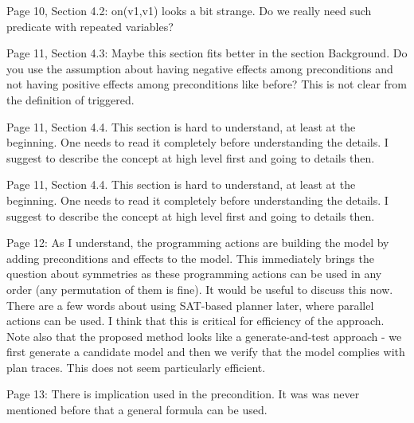 \documentclass{article}
\begin{document}
\begin{mdframed}[hidealllines=true,backgroundcolor=gray!20]
  Page 10, Section 4.2: on(v1,v1) looks a bit strange. Do we really need such predicate with repeated variables?
\end{mdframed}

\begin{mdframed}[hidealllines=true,backgroundcolor=gray!20]
  Page 11, Section 4.3: Maybe this section fits better in the section Background. Do you use the assumption about having negative effects among preconditions and not having positive effects among preconditions like before? This is not clear from the definition of triggered.
\end{mdframed}

\begin{mdframed}[hidealllines=true,backgroundcolor=gray!20]
  Page 11, Section 4.4. This section is hard to understand, at least at the beginning. One needs to read it completely before understanding the details. I suggest to describe the concept at high level first and going to details then.
\end{mdframed}

\begin{mdframed}[hidealllines=true,backgroundcolor=gray!20]
  Page 11, Section 4.4. This section is hard to understand, at least at the beginning. One needs to read it completely before understanding the details. I suggest to describe the concept at high level first and going to details then.
\end{mdframed}

\begin{mdframed}[hidealllines=true,backgroundcolor=gray!20]
  Page 12: As I understand, the programming actions are building the model by adding preconditions and effects to the model. This immediately brings the question about symmetries as these programming actions can be used in any order (any permutation of them is fine). It would be useful to discuss this now. There are a few words about using SAT-based planner later, where parallel actions can be used. I think that this is critical for efficiency of the approach. Note also that the proposed method looks like a generate-and-test approach - we first generate a candidate model and then we verify that the model complies with plan traces. This does not seem particularly efficient.
\end{mdframed}

\begin{mdframed}[hidealllines=true,backgroundcolor=gray!20]
  Page 13: There is implication used in the precondition. It was was never mentioned before that a general formula can be used.
\end{mdframed}
\end{document}
